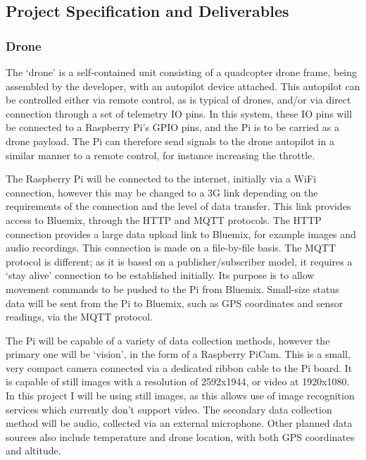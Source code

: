 \documentclass{article}
\begin{document}
\subsection{Project Specification and Deliverables}
\subsubsection{Drone}
The `drone' is a self-contained unit consisting of a quadcopter drone frame, being assembled by the developer, with an autopilot device attached. This autopilot can be controlled either via remote control, as is typical of drones, and/or via direct connection through a set of telemetry IO pins. In this system, these IO pins will be connected to a Raspberry Pi's GPIO pins, and the Pi is to be carried as a drone payload. The Pi can therefore send signals to the drone autopilot in a similar manner to a remote control, for instance increasing the throttle.

The Raspberry Pi will be connected to the internet, initially via a WiFi connection, however this may be changed to a 3G link depending on the requirements of the connection and the level of data transfer. This link provides access to Bluemix, through the HTTP and MQTT protocols. The HTTP connection provides a large data upload link to Bluemix, for example images and audio recordings. This connection is made on a file-by-file basis. The MQTT protocol is different; as it is based on a publisher/subscriber model, it requires a `stay alive' connection to be established initially. Its purpose is to allow movement commands to be pushed to the Pi from Bluemix. Small-size status data will be sent from the Pi to Bluemix, such as GPS coordinates and sensor readings, via the MQTT protocol.

The Pi will be capable of a variety of data collection methods, however the primary one will be `vision', in the form of a Raspberry PiCam. This is a small, very compact camera connected via a dedicated ribbon cable to the Pi board. It is capable of still images with a resolution of 2592x1944, or video at 1920x1080. In this project I will be using still images, as this allows use of image recognition services which currently don't support video. The secondary data collection method will be audio, collected via an external microphone. Other planned data sources also include temperature and drone location, with both GPS coordinates and altitude.
\end{document}
